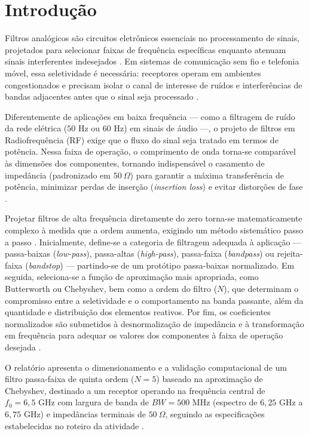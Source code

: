 \section{Introdução}
\label{sec:introducao}

Filtros analógicos são circuitos eletrônicos essenciais no processamento de sinais, projetados para selecionar faixas de frequência específicas enquanto atenuam sinais interferentes indesejados \cite{razavi2006fund}. Em sistemas de comunicação sem fio e telefonia móvel, essa seletividade é necessária: receptores operam em ambientes congestionados e precisam isolar o canal de interesse de ruídos e interferências de bandas adjacentes antes que o sinal seja processado \cite{razavi2006fund}.

Diferentemente de aplicações em baixa frequência — como a filtragem de ruído da rede elétrica ($50\text{ Hz}$ ou $60\text{ Hz}$) em sinais de áudio —, o projeto de filtros em Radiofrequência (RF) exige que o fluxo do sinal seja tratado em termos de potência. Nessa faixa de operação, o comprimento de onda torna-se comparável às dimensões dos componentes, tornando indispensável o casamento de impedância (padronizado em $50~\Omega$) para garantir a máxima transferência de potência, minimizar perdas de inserção (\textit{insertion loss}) e evitar distorções de fase \cite{ludwig2000rf}.

Projetar filtros de alta frequência diretamente do zero torna-se matematicamente complexo à medida que a ordem aumenta, exigindo um método sistemático passo a passo \cite{ludwig2000rf}. Inicialmente, define-se a categoria de filtragem adequada à aplicação — passa-baixas (\textit{low-pass}), passa-altas (\textit{high-pass}), passa-faixa (\textit{bandpass}) ou rejeita-faixa (\textit{bandstop}) — partindo-se de um protótipo passa-baixas normalizado. Em seguida, seleciona-se a função de aproximação mais apropriada, como Butterworth ou Chebyshev, bem como a ordem do filtro ($N$), que determinam o compromisso entre a seletividade e o comportamento na banda passante, além da quantidade e distribuição dos elementos reativos. Por fim, os coeficientes normalizados são submetidos à desnormalização de impedância e à transformação em frequência para adequar os valores dos componentes à faixa de operação desejada \cite{ludwig2000rf}.

O relatório apresenta o dimensionamento e a validação computacional de um filtro passa-faixa de quinta ordem ($N = 5$) baseado na aproximação de Chebyshev, destinado a um receptor operando na frequência central de $f_0 = 6{,}5\text{ GHz}$ com largura de banda de $BW = 500\text{ MHz}$ (espectro de $6{,}25\text{ GHz}$ a $6{,}75\text{ GHz}$) e impedâncias terminais de $50~\Omega$, seguindo as especificações estabelecidas no roteiro da atividade \cite{Filter1}.

